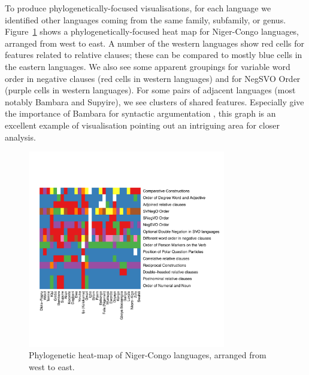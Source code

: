 \documentclass[11pt]{article}
\begin{document}
To produce phylogenetically-focused visualisations, for each language we identified other languages coming from the same family, subfamily, or genus. Figure~\ref{fig:heat2} shows a phylogenetically-focused heat map for Niger-Congo languages, arranged from west to east. A number of the western languages show red cells for features related to relative clauses; these can be compared to mostly blue cells in the eastern languages. We also see some apparent groupings for variable word order in negative clauses (red cells in western languages) and for NegSVO Order (purple cells in western languages). For some pairs of adjacent languages (most notably Bambara and Supyire), we see clusters of shared features. Especially give the importance of Bambara for 
syntactic argumentation \cite{culy}, this graph is an excellent example of visualisation pointing out an intriguing area for closer analysis.


\begin{figure}[ht!]
\includegraphics[width=3.4in]
{graph3nigercongosmall.pdf} 
\caption{Phylogenetic heat-map of Niger-Congo languages, arranged from west to east.} 
\label{fig:heat2} 
\end{figure}
\end{document}
